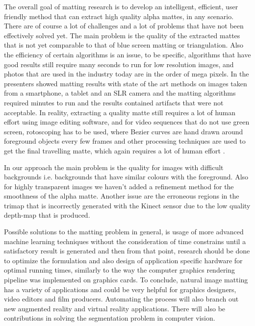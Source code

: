 The overall goal of matting research is to develop an intelligent, efficient, user friendly method that can extract high quality alpha mattes, in any scenario. There are of course a lot of challenges and a lot of problems that have not been effectively solved yet. The main problem is the quality of the extracted mattes that is not yet comparable to that of blue screen matting or triangulation. Also the efficiency of certain algorithms is an issue, to be specific, algorithms that have good results still require many seconds to run for low resolution images, and photos that are used in the industry today are in the order of mega pixels. In \cite{mattingtutorial} the presenters showed matting results with state of the art methods on images taken from a smartphone, a tablet and an SLR camera and the matting algorithms required minutes to run and the results contained artifacts that were not acceptable.   
In reality, extracting a quality matte still requires a lot of human effort using image editing software, and for video sequences that do not use green screen, rotoscoping has to be used, where Bezier curves are hand drawn around foreground objects every few frames and other processing techniques are used to get the final travelling matte, which again requires a lot of human effort \cite{visualeffects}.
\par
In our approach the main problem is the quality for images with difficult backgrounds i.e. backgrounds that have similar colours with the foreground. Also for highly transparent images we haven’t added a refinement method for the smoothness of the alpha matte. Another issue are the erroneous regions in the trimap that is incorrectly generated with the Kinect sensor due to the low quality depth-map that is produced. 
\par
Possible solutions to the matting problem in general, is usage of more advanced machine learning techniques without the consideration of time constrains until a satisfactory result is generated and then from that point, research should be done to optimize the formulation and also design of application specific hardware for optimal running times, similarly to the way the computer graphics rendering pipeline was implemented on graphics cards. 
To conclude, natural image matting has a variety of applications and could be very helpful for graphics designers, video editors and film producers. Automating the process will also branch out new augmented reality and virtual reality applications. There will also be contributions in solving the segmentation problem in computer vision.
